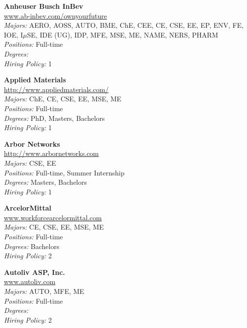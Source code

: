 \documentclass[twoside]{article}
\begin{document}
\begin{center}
\begin{multicols}{3}
\begin{minipage}{.9\columnwidth}{\Large\bf Anheuser Busch InBev }\\
	\url{www.ab-inbev.com/ownyourfuture}\\
	\emph{Majors:} AERO, AOSS, AUTO, BME, ChE, CEE, CE, CSE, EE, EP, ENV, FE, IOE, I$\mu$SE, IDE (UG), IDP, MFE, MSE, ME, NAME, NERS, PHARM\\
	\emph{Positions:} Full-time\\
	\emph{Degrees:} \\
	\emph{Hiring Policy:} 1\\
\end{minipage}
 
\begin{minipage}{.9\columnwidth}{\Large\bf Applied Materials }\\
	\url{http://www.appliedmaterials.com/}\\
	\emph{Majors:} ChE, CE, CSE, EE, MSE, ME\\
	\emph{Positions:} Full-time\\
	\emph{Degrees:} PhD, Masters, Bachelors\\
	\emph{Hiring Policy:} 1\\
\end{minipage}
 
\begin{minipage}{.9\columnwidth}{\Large\bf Arbor Networks }\\
	\url{http://www.arbornetworks.com}\\
	\emph{Majors:} CSE, EE\\
	\emph{Positions:} Full-time, Summer Internship\\
	\emph{Degrees:} Masters, Bachelors\\
	\emph{Hiring Policy:} 1\\
\end{minipage}
 
\begin{minipage}{.9\columnwidth}{\Large\bf ArcelorMittal }\\
	\url{www.workforcearcelormittal.com}\\
	\emph{Majors:} CE, CSE, EE, MSE, ME\\
	\emph{Positions:} Full-time\\
	\emph{Degrees:} Bachelors\\
	\emph{Hiring Policy:} 2\\
\end{minipage}
 
\begin{minipage}{.9\columnwidth}{\Large\bf Autoliv ASP, Inc. }\\
	\url{www.autoliv.com}\\
	\emph{Majors:} AUTO, MFE, ME\\
	\emph{Positions:} Full-time\\
	\emph{Degrees:} \\
	\emph{Hiring Policy:} 2\\
\end{minipage}
 

\end{multicols}
\end{center}
\end{document}
